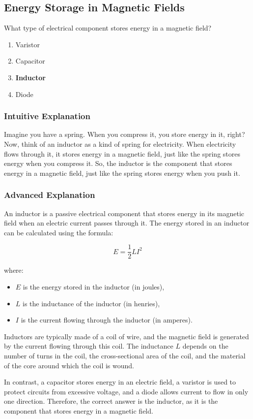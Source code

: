 \subsection{Energy Storage in Magnetic Fields}
\label{T6A06}

\begin{tcolorbox}[colback=gray!10!white,colframe=black!75!black,title=T6A06]
What type of electrical component stores energy in a magnetic field?
\begin{enumerate}[label=\Alph*)]
    \item Varistor
    \item Capacitor
    \item \textbf{Inductor}
    \item Diode
\end{enumerate}
\end{tcolorbox}

\subsubsection{Intuitive Explanation}
Imagine you have a spring. When you compress it, you store energy in it, right? Now, think of an inductor as a kind of spring for electricity. When electricity flows through it, it stores energy in a magnetic field, just like the spring stores energy when you compress it. So, the inductor is the component that stores energy in a magnetic field, just like the spring stores energy when you push it.

\subsubsection{Advanced Explanation}
An inductor is a passive electrical component that stores energy in its magnetic field when an electric current passes through it. The energy stored in an inductor can be calculated using the formula:

\[
E = \frac{1}{2} L I^2
\]

where:
\begin{itemize}
    \item \( E \) is the energy stored in the inductor (in joules),
    \item \( L \) is the inductance of the inductor (in henries),
    \item \( I \) is the current flowing through the inductor (in amperes).
\end{itemize}

Inductors are typically made of a coil of wire, and the magnetic field is generated by the current flowing through this coil. The inductance \( L \) depends on the number of turns in the coil, the cross-sectional area of the coil, and the material of the core around which the coil is wound.

In contrast, a capacitor stores energy in an electric field, a varistor is used to protect circuits from excessive voltage, and a diode allows current to flow in only one direction. Therefore, the correct answer is the inductor, as it is the component that stores energy in a magnetic field.

